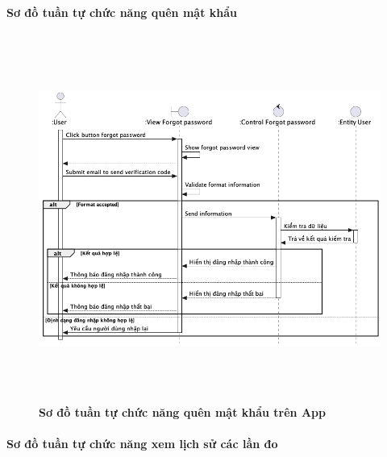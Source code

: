 \paragraph{Sơ đồ tuần tự chức năng quên mật khẩu}
\mbox{}

    \begin{figure}[H]
         \centering
         \includegraphics[width=16cm,height=12cm]{Images/mobile_app/forgot_password.png}
         \caption[Sơ đồ tuần tự chức năng quên mật khẩu trên App]{\bfseries \fontsize{12pt}{0pt}
         \selectfont Sơ đồ tuần tự chức năng quên mật khẩu trên App}
         \label{hinh21} %
    \end{figure}

\paragraph{Sơ đồ tuần tự chức năng xem lịch sử các lần đo}
\mbox{}


